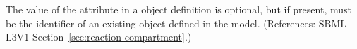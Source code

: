 The value of the  attribute in a \Reaction object
definition is optional, but if present, must be the identifier of an
existing \Compartment object defined in the model.  (References: SBML L3V1
Section~\ref{sec:reaction-compartment}.)
